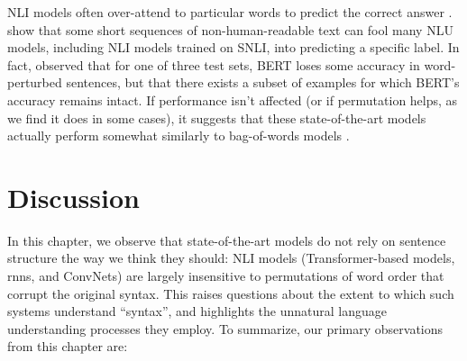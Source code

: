 \documentclass[letterpaper, 12pt]{report}
\begin{document}
NLI models often over-attend to particular words to predict the correct answer \citep{gururangan-etal-2018-annotation, clark-etal-2019-bert}. \cite{wallace-etal-2019-universal} show that some short sequences of non-human-readable text can fool many NLU models, including NLI models trained on SNLI, into predicting a specific label. In fact, \cite{ettinger-2020-whatbertisnot} observed that for one of three test sets, BERT loses some accuracy in word-perturbed sentences, but that there exists a subset of examples for which BERT’s accuracy remains intact.
If performance isn't affected (or if permutation helps, as we find it does in some cases), it suggests that these state-of-the-art models actually perform somewhat similarly to bag-of-words models \cite{blei-etal-2003-latent, mikolov2013efficient}.




\section{Discussion}
\label{sec:unli_discussion}

In this chapter, we observe that state-of-the-art models do not rely on sentence structure the way we think they should: NLI models (Transformer-based models, \acrshort{rnn}s, and ConvNets) are largely insensitive to permutations of word order that corrupt the original syntax. This raises questions about the extent to which such systems understand ``syntax'', and highlights the unnatural language understanding processes they employ. To summarize, our primary observations from this chapter are:
\end{document}
